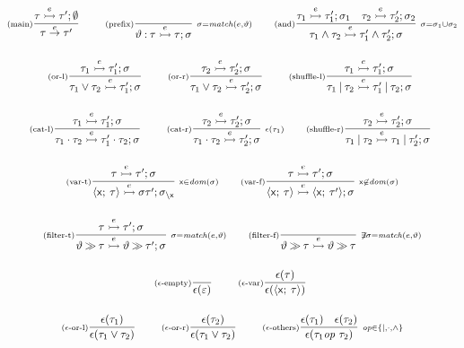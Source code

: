 \begin{gather*}
\Rule{main}
{\tau\extrans{\ev}\tau';\emptyset}
{\tau\trans{\ev}\tau'}
{}
\qquad
\Rule{prefix}
{}
{\eventTy\prefixop\tau\extrans{\ev}\tau;\subs}
{
  \subs=\mtch(\ev,\eventTy)
}
\qquad
\Rule{and}
{\tau_1\extrans{\ev}\tau'_1;\subs_1\quad\tau_2\extrans{\ev}\tau'_2;\subs_2}
{\tau_1\andop\tau_2\extrans{\ev}\tau'_1\andop\tau'_2;\subs}
{\subs=\subs_1\subsMerge\subs_2}
\\[3ex]
\Rule{or-l}
{\tau_1\extrans{\ev}\tau'_1;\subs}
{\tau_1\orop\tau_2\extrans{\ev}\tau'_1;\subs}
{}
\qquad
\Rule{or-r}
{\tau_2\extrans{\ev}\tau'_2;\subs}
{\tau_1\orop\tau_2\extrans{\ev}\tau'_2;\subs}
{}
\qquad
\Rule{shuffle-l}
{\tau_1\extrans{\ev}\tau'_1;\subs}
{\tau_1\shuffleop\tau_2\extrans{\ev}\tau'_1\shuffleop\tau_2;\subs}
{}
\\[3ex]
\Rule{cat-l}
{\tau_1\extrans{\ev}\tau'_1;\subs}
{\tau_1\catop\tau_2\extrans{\ev}\tau'_1\catop\tau_2;\subs}
{}
\qquad
\Rule{cat-r}
{\tau_2\extrans{\ev}\tau'_2;\subs}
{\tau_1\catop\tau_2\extrans{\ev}\tau'_2;\subs}
{\isEmpty(\tau_1)}
\qquad
\Rule{shuffle-r}
{\tau_2\extrans{\ev}\tau'_2;\subs}
{\tau_1\shuffleop\tau_2\extrans{\ev}\tau_1\shuffleop\tau'_2;\subs}
{}
\\[3ex]
\Rule{var-t}
{\tau\extrans{\ev}\tau';\subs}
{\var{\xv}{\tau}\extrans{\ev}\subs\tau';\restrict{\subs}{\xv}}
{\xv\in\dom(\subs)}
\qquad
\Rule{var-f}
{\tau\extrans{\ev}\tau';\subs}
{\var{\xv}{\tau}\extrans{\ev}\var{\xv}{\tau'};\subs}
{\xv\not\in\dom(\subs)}
\\[3ex]
\Rule{filter-t}
{\tau\extrans{\ev}\tau';\subs}
{\eventTy \filterop \tau \extrans{\ev} \eventTy \filterop \tau';\subs}
{\subs=\mtch(\ev,\eventTy)}
\qquad
\Rule{filter-f}
{}
{\eventTy \filterop \tau \extrans{\ev} \eventTy \filterop \tau}
{\not\exists\subs=\mtch(\ev,\eventTy)}
\\[3ex]
\Rule{$\isEmpty$-empty}
{}
{\isEmpty(\emptyseq)}
{}
\qquad
\Rule{$\isEmpty$-var}
{\isEmpty(\tau)}
{\isEmpty(\var{\xv}{\tau})}
{}
\\[3ex]
\Rule{$\isEmpty$-or-l}
{\isEmpty(\tau_1)}
{\isEmpty(\tau_1\orop\tau_2)}
{}
\qquad
\Rule{$\isEmpty$-or-r}
{\isEmpty(\tau_2)}
{\isEmpty(\tau_1\orop\tau_2)}
{}
\qquad
\Rule{$\isEmpty$-others}
{\isEmpty(\tau_1)\quad\isEmpty(\tau_2)}
{\isEmpty(\tau_1 \op\ \tau_2)}
{\op\in\{\shuffleop,\catop,\andop\}}
\end{gather*}
